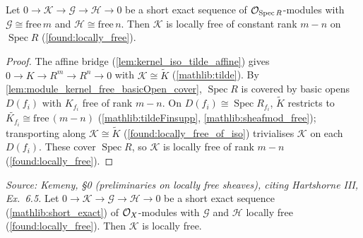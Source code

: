 \begin{lemma}
  \label{lem:isLocallyFree_kernel_on_affine}
  Let \(0\to\mathcal K\to\mathcal G\to\mathcal H\to 0\) be a short exact sequence
  of \(\mathcal{O}_{\operatorname{Spec}R}\)-modules with \(\mathcal G\cong\mathrm{free}\,m\)
  and \(\mathcal H\cong\mathrm{free}\,n\).  Then \(\mathcal K\) is locally free of
  constant rank \(m-n\) on \(\operatorname{Spec}R\) (\cref{found:locally_free}).
\end{lemma}

\begin{proof}
  The affine bridge (\cref{lem:kernel_iso_tilde_affine}) gives
  \(0\to K\to R^m\to R^n\to 0\) with \(\mathcal K\cong\widetilde K\)
  (\cref{mathlib:tilde}).  By \cref{lem:module_kernel_free_basicOpen_cover},
  \(\operatorname{Spec}R\) is covered by basic opens \(D(f_i)\) with \(K_{f_i}\) free
  of rank \(m-n\).  On \(D(f_i)\cong\operatorname{Spec}R_{f_i}\), \(\widetilde K\)
  restricts to \(\widetilde{K_{f_i}}\cong\mathrm{free}\,(m-n)\)
  (\cref{mathlib:tildeFinsupp}, \cref{mathlib:sheafmod_free}); transporting along
  \(\mathcal K\cong\widetilde K\) (\cref{found:locally_free_of_iso}) trivialises
  \(\mathcal K\) on each \(D(f_i)\).  These cover \(\operatorname{Spec}R\), so
  \(\mathcal K\) is locally free of rank \(m-n\) (\cref{found:locally_free}).
\end{proof}

\begin{lemma}
  \label{found:isLocallyFree_kernel_of_shortExact}
  \textit{Source: Kemeny, \S0 (preliminaries on locally free sheaves), citing
  Hartshorne III, Ex.~6.5.}
  Let \(0\to\mathcal K\to\mathcal G\to\mathcal H\to 0\) be a short exact sequence
  (\cref{mathlib:short_exact}) of \(\mathcal{O}_X\)-modules with \(\mathcal G\) and
  \(\mathcal H\) locally free (\cref{found:locally_free}).  Then \(\mathcal K\) is
  locally free.
\end{lemma}

